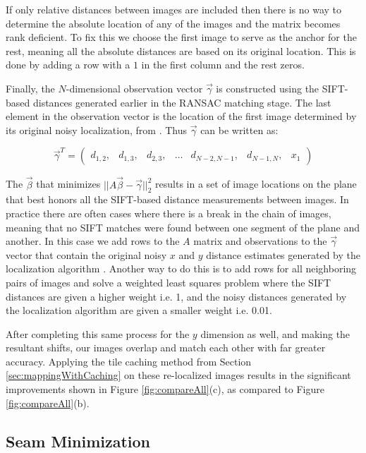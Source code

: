 \documentclass[10pt,twocolumn,letterpaper]{article}
\begin{document}
If only relative distances between images are included then there is
no way to determine the absolute location of any of the images and the
matrix becomes rank deficient. To fix this we choose the first image
to serve as the anchor for the rest, meaning all the absolute
distances are based on its original location. This is done by adding a
row with a $1$ in the first column and the rest zeros.

Finally, the $N$-dimensional observation vector $\vec{\gamma}$ is
constructed using the SIFT-based distances generated earlier in the
RANSAC matching stage. The last element in the observation vector is
the location of the first image determined by its original noisy
localization, from \cite{chen2010indoor, liu2010indoor}. Thus
$\vec{\gamma}$ can be written as:

\[
\vec{\gamma}^T =
\begin{pmatrix}
  d_{1,2}, &d_{1,3}, &d_{2,3}, &\hdots &d_{N-2,N-1}, &d_{N-1,N}, &x_1
\end{pmatrix}
\]

The $\vec{\beta}$ that minimizes $||A \vec{\beta} -
\vec{\gamma}||_2^2$ results in a set of image locations on the plane
that best honors all the SIFT-based distance measurements between
images. In practice there are often cases where there is a break in
the chain of images, meaning that no SIFT matches were found between
one segment of the plane and another. In this case we add rows to the
$A$ matrix and observations to the $\vec{\gamma}$ vector that contain
the original noisy $x$ and $y$ distance estimates generated by the
localization algorithm \cite{chen2010indoor, liu2010indoor}. Another
way to do this is to add rows for all neighboring pairs of images and
solve a weighted least squares problem where the SIFT distances are
given a higher weight i.e. 1, and the noisy distances generated by the
localization algorithm \cite{chen2010indoor, liu2010indoor} are given
a smaller weight i.e. 0.01.

After completing this same process for the $y$ dimension as well, and
making the resultant shifts, our images overlap and match each other
with far greater accuracy. Applying the tile caching method from
Section \ref{sec:mappingWithCaching} on these re-localized images
results in the significant improvements shown in Figure
\ref{fig:compareAll}(c), as compared to Figure
\ref{fig:compareAll}(b).


\subsection{Seam Minimization}
\label{sec:seamMinimization}
\end{document}
